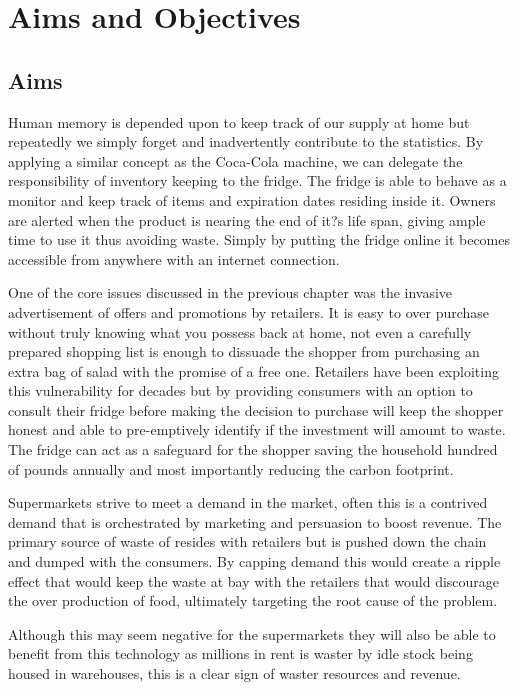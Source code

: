 \documentclass[a4paper, 11pt]{article}
\begin{document}
\section{Aims and Objectives}
\subsection{Aims}
Human memory is depended upon to keep track of our supply at home but repeatedly we simply forget and inadvertently contribute to the statistics. By applying a similar concept as the Coca-Cola machine, we can delegate the responsibility of inventory keeping to the fridge. The fridge is able to behave as a monitor and keep track of items and expiration dates residing inside it. Owners are alerted when the product is nearing the end of it?s life span, giving ample time to use it thus avoiding waste. Simply by putting the fridge online it becomes accessible from anywhere with an internet connection.

One of the core issues discussed in the previous chapter was the invasive advertisement of offers and promotions by retailers. It is easy to over purchase without truly knowing what you possess back at home, not even a carefully prepared shopping list is enough to dissuade the shopper from purchasing an extra bag of salad with the promise of a free one. Retailers have been exploiting this vulnerability for decades but by providing consumers with an option to consult their fridge before making the decision to purchase will keep the shopper honest and able to pre-emptively identify if the investment will amount to waste. The fridge can act as a safeguard for the shopper saving the household hundred of pounds annually and most importantly reducing the carbon footprint. 

Supermarkets strive to meet a demand in the market, often this is a contrived demand that is orchestrated by marketing and persuasion to boost revenue. The primary source of waste of resides with retailers but is pushed down the chain and dumped with the consumers. By capping demand this would create a ripple effect that would keep the waste at bay with the retailers that would discourage the over production of food, ultimately targeting the root cause of the problem.

Although this may seem negative for the supermarkets they will also be able to benefit from this technology as millions in rent is waster by idle stock being housed in warehouses, this is a clear sign of waster resources and revenue. 
\end{document}
